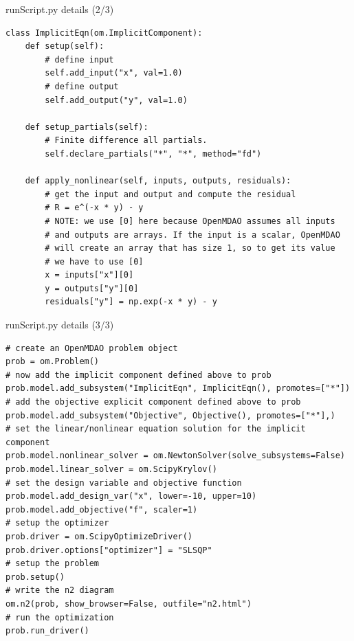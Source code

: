 \documentclass{bredelebeamer}
\begin{document}
\begin{frame}[fragile]{runScript.py details (2/3)}
  \footnotesize
  \lstset{ language=python }
  \begin{lstlisting}
class ImplicitEqn(om.ImplicitComponent):
    def setup(self):
        # define input
        self.add_input("x", val=1.0)
        # define output
        self.add_output("y", val=1.0)

    def setup_partials(self):
        # Finite difference all partials.
        self.declare_partials("*", "*", method="fd")

    def apply_nonlinear(self, inputs, outputs, residuals):
        # get the input and output and compute the residual
        # R = e^(-x * y) - y
        # NOTE: we use [0] here because OpenMDAO assumes all inputs
        # and outputs are arrays. If the input is a scalar, OpenMDAO
        # will create an array that has size 1, so to get its value
        # we have to use [0]
        x = inputs["x"][0]
        y = outputs["y"][0]
        residuals["y"] = np.exp(-x * y) - y
  \end{lstlisting}
  \normalsize
\end{frame}


\begin{frame}[fragile]{runScript.py details (3/3)}
  \footnotesize
  \lstset{ language=python }
  \begin{lstlisting}
# create an OpenMDAO problem object
prob = om.Problem()
# now add the implicit component defined above to prob
prob.model.add_subsystem("ImplicitEqn", ImplicitEqn(), promotes=["*"])
# add the objective explicit component defined above to prob
prob.model.add_subsystem("Objective", Objective(), promotes=["*"],)
# set the linear/nonlinear equation solution for the implicit component
prob.model.nonlinear_solver = om.NewtonSolver(solve_subsystems=False)
prob.model.linear_solver = om.ScipyKrylov()
# set the design variable and objective function
prob.model.add_design_var("x", lower=-10, upper=10)
prob.model.add_objective("f", scaler=1)
# setup the optimizer
prob.driver = om.ScipyOptimizeDriver()
prob.driver.options["optimizer"] = "SLSQP"
# setup the problem
prob.setup()
# write the n2 diagram
om.n2(prob, show_browser=False, outfile="n2.html")
# run the optimization
prob.run_driver()
  \end{lstlisting}
  \normalsize
\end{frame}
\end{document}
